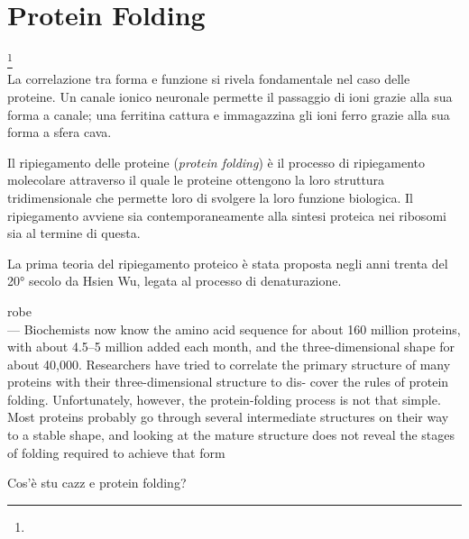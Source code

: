 \chapter{Protein Folding}

\footnote{}\\

La correlazione tra forma e funzione si rivela fondamentale nel caso delle proteine. Un canale ionico neuronale permette il passaggio di ioni grazie alla sua forma a canale; una ferritina cattura e immagazzina gli ioni ferro grazie alla sua forma a sfera cava. 

\par Il ripiegamento delle proteine (\textit{protein folding}) è il processo di ripiegamento molecolare attraverso il quale le proteine ottengono la loro struttura tridimensionale che permette loro di svolgere la loro funzione biologica. Il ripiegamento avviene sia contemporaneamente alla sintesi proteica nei ribosomi sia al termine di questa.

\par La prima teoria del ripiegamento proteico è stata proposta negli anni trenta del 20° secolo da Hsien Wu\supercite{wu1931studies}, legata al processo di denaturazione.  

\par robe \\


--- Biochemists now know the amino acid sequence for about
160 million proteins, with about 4.5–5 million added each
month, and the three-dimensional shape for about 40,000.
Researchers have tried to correlate the primary structure of
many proteins with their three-dimensional structure to dis-
cover the rules of protein folding. Unfortunately, however,
the protein-folding process is not that simple. Most proteins
probably go through several intermediate structures on their
way to a stable shape, and looking at the mature structure
does not reveal the stages of folding required to achieve that
form

Cos'è stu cazz e protein folding?

